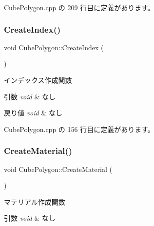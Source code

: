  Cube\+Polygon.\+cpp の 209 行目に定義があります。

\mbox{\label{class_cube_polygon_ade2e155c44798710b8e91ac84b02340f}} 
\subsubsection{\texorpdfstring{Create\+Index()}{CreateIndex()}}
{\footnotesize\ttfamily void Cube\+Polygon\+::\+Create\+Index (\begin{DoxyParamCaption}{ }\end{DoxyParamCaption})\hspace{0.3cm}{\ttfamily [private]}}



インデックス作成関数 


\begin{DoxyParams}{引数}
{\em void} & なし \\
\hline
\end{DoxyParams}

\begin{DoxyRetVals}{戻り値}
{\em void} & なし \\
\hline
\end{DoxyRetVals}


 Cube\+Polygon.\+cpp の 156 行目に定義があります。

\mbox{\label{class_cube_polygon_abc3b69a3cb237dec28d0bba9229f0b8d}} 
\subsubsection{\texorpdfstring{Create\+Material()}{CreateMaterial()}}
{\footnotesize\ttfamily void Cube\+Polygon\+::\+Create\+Material (\begin{DoxyParamCaption}{ }\end{DoxyParamCaption})\hspace{0.3cm}{\ttfamily [private]}}



マテリアル作成関数 


\begin{DoxyParams}{引数}
{\em void} & なし \\
\hline
\end{DoxyParams}

